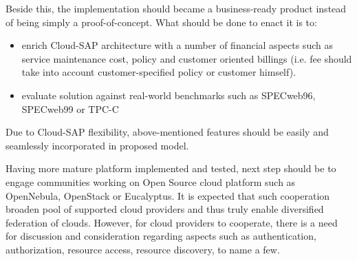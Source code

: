 Beside this, the implementation should became a business-ready product instead of being simply a proof-of-concept. What should be done to enact it is to:
\begin{itemize}
 \item enrich Cloud-SAP architecture with a number of financial aspects such as service maintenance cost, policy and customer oriented billings (i.e. fee should take into account customer-specified policy or customer himself).
 \item evaluate solution against real-world benchmarks such as SPECweb96, SPECweb99 or TPC-C
\end{itemize}
Due to Cloud-SAP flexibility, above-mentioned features should be easily and seamlessly incorporated in proposed model.


Having more mature platform implemented and tested, next step should be to engage communities working on Open Source cloud platform such as OpenNebula, OpenStack or Eucalyptus. It is expected that such cooperation broaden pool of supported cloud providers and thus truly enable diversified federation of clouds. However, for cloud providers to cooperate, there is a need for discussion and consideration regarding aspects such as authentication, authorization, resource
 access, resource discovery, to name a few.

